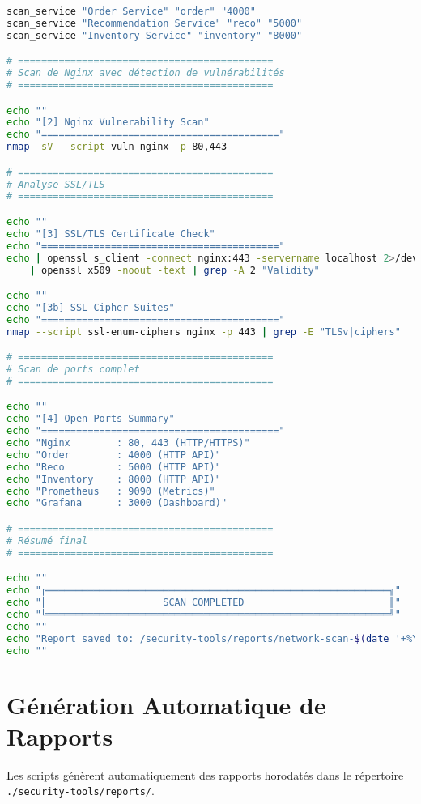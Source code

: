 \documentclass[11pt,a4paper]{report}
\begin{document}
\begin{lstlisting}[language=bash, caption=network-scan.sh - Script Complet, basicstyle=\ttfamily\tiny]
scan_service "Order Service" "order" "4000"
scan_service "Recommendation Service" "reco" "5000"
scan_service "Inventory Service" "inventory" "8000"

# ============================================
# Scan de Nginx avec détection de vulnérabilités
# ============================================

echo ""
echo "[2] Nginx Vulnerability Scan"
echo "========================================="
nmap -sV --script vuln nginx -p 80,443

# ============================================
# Analyse SSL/TLS
# ============================================

echo ""
echo "[3] SSL/TLS Certificate Check"
echo "========================================="
echo | openssl s_client -connect nginx:443 -servername localhost 2>/dev/null \
    | openssl x509 -noout -text | grep -A 2 "Validity"

echo ""
echo "[3b] SSL Cipher Suites"
echo "========================================="
nmap --script ssl-enum-ciphers nginx -p 443 | grep -E "TLSv|ciphers"

# ============================================
# Scan de ports complet
# ============================================

echo ""
echo "[4] Open Ports Summary"
echo "========================================="
echo "Nginx        : 80, 443 (HTTP/HTTPS)"
echo "Order        : 4000 (HTTP API)"
echo "Reco         : 5000 (HTTP API)"
echo "Inventory    : 8000 (HTTP API)"
echo "Prometheus   : 9090 (Metrics)"
echo "Grafana      : 3000 (Dashboard)"

# ============================================
# Résumé final
# ============================================

echo ""
echo "╔═══════════════════════════════════════════════════════════╗"
echo "║                    SCAN COMPLETED                         ║"
echo "╚═══════════════════════════════════════════════════════════╝"
echo ""
echo "Report saved to: /security-tools/reports/network-scan-$(date '+%Y%m%d_%H%M%S').txt"
echo ""
\end{lstlisting}

\section{Génération Automatique de Rapports}

Les scripts génèrent automatiquement des rapports horodatés dans le répertoire \texttt{./security-tools/reports/}.
\end{document}
